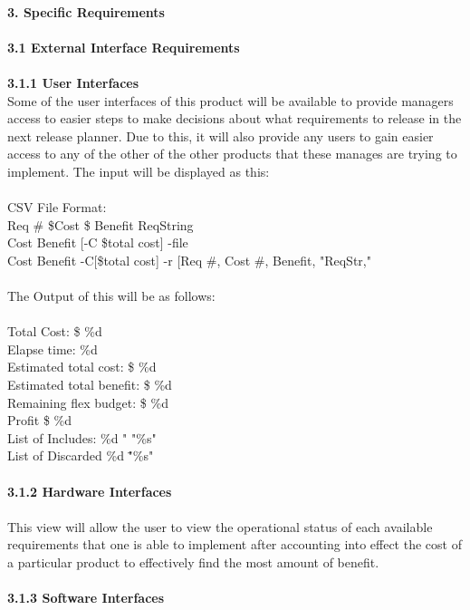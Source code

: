 \documentclass{article}
\begin{document}
\\
\noindent
\textbf{3. Specific Requirements}
\noindent
\\
\\
\noindent
\textbf{\hspace{4ex} 3.1 External Interface Requirements}
\\
\\
\textbf{\hspace{8ex} 3.1.1 User Interfaces}
\\
Some of the user interfaces of this product will be available to provide managers access to easier steps to make decisions about what requirements to release in the next release planner. Due to this, it will also provide any users to gain easier access to any of the other of the other products that these manages are trying to implement.
The input will be displayed as this:
\\
\\
CSV File Format:
\\
Req \# \$Cost \$ Benefit ReqString
\\
Cost Benefit [-C \$total cost] -file
\\
Cost Benefit -C[\$total cost] -r [Req \#, Cost \#, Benefit, "ReqStr,"
\\
\\
The Output of this will be as follows:
\\
\\
Total Cost: \$ \%d
\\
Elapse time: \%d
\\
Estimated total cost: \$ \%d
\\
Estimated total benefit: \$ \%d
\\
Remaining flex budget: \$ \%d
\\
Profit \$ \%d
\\
List of Includes: \%d " "\%s"
\\
List of Discarded \%d \""\%s"
\\
\\
\textbf{\hspace{8ex} 3.1.2 Hardware Interfaces}
\\
\\
This view will allow the user to view the operational status of each available requirements that one is able to implement after accounting into effect the cost of a particular product to effectively find the most amount of benefit.  
\\
\\
\textbf{\hspace{8ex} 3.1.3 Software Interfaces}
\end{document}

